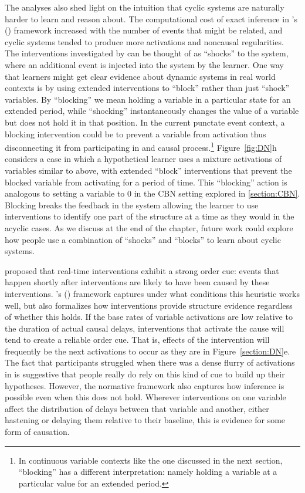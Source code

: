 \documentclass{cambridge7A}%
\def\citeapos#1{\citeauthor{#1}'s (\citeyear{#1})}
\begin{document}
The analyses also shed light on the intuition that cyclic systems are naturally harder to learn and reason about. The computational cost of exact inference in \citeapos{bramley2018time} framework increased with the number of events that might be related, and cyclic systems tended to produce more activations and noncausal regularities.  The interventions investigated by \cite{bramley2017dynamic} can be thought of as ``shocks'' to the system, where an additional event is injected into the system by the learner.  One way that learners might get clear evidence about dynamic systems in real world contexts is by using extended interventions to ``block'' rather than just ``shock'' variables. By ``blocking'' we mean holding a variable in a particular state for an extended period, while ``shocking'' instantaneously changes the value of a variable but does not hold it in that position.  In the current punctate event context, a blocking intervention could be to prevent a variable from activation thus disconnecting it from participating in and causal process.\footnote{In continuous variable contexts like the one discussed in the next section, ``blocking'' has a different interpretation: namely holding a variable at a particular value for an extended period.}  Figure~\ref{fig:DN}h considers a case in which a hypothetical learner uses a mixture activations of variables similar to above, with extended ``block'' interventions that prevent the blocked variable from activating for a period of time.  This ``blocking'' action is analogous to setting a variable to 0 in the CBN setting explored in \ref{section:CBN}.  
Blocking breaks the feedback in the system allowing the learner to use interventions to identify one part of the structure at a time as they would in the acyclic cases.  As we discuss at the end of the chapter, future work could explore how people use a combination of ``shocks'' and ``blocks'' to learn about cyclic systems.

\cite{lagnado2004advantage} proposed that real-time interventions exhibit a strong order cue: events that happen shortly after interventions are likely to have been caused by these interventions.  \citeapos{bramley2018time} framework captures under what conditions this heuristic works well, but also formalizes how interventions provide structure evidence regardless of whether this holds.  If the base rates of variable activations are low relative to the duration of actual causal delays, interventions that activate the cause will tend to create a reliable order cue.  That is, effects of the intervention will frequently be the next activations to occur as they are in Figure~\ref{section:DN}e.  The fact that participants struggled when there was a dense flurry of activations in \cite{bramley2017dynamic} is suggestive that people really do rely on this kind of cue to build up their hypotheses.  
However, the normative framework also captures how inference is possible even when this does not hold.  Wherever interventions on one variable affect the distribution of delays between that variable and another, either hastening or delaying them relative to their baseline, this is evidence for some form of causation.
\end{document}
